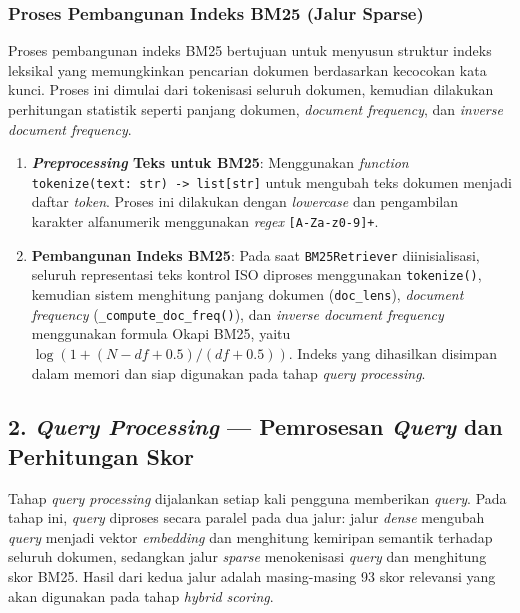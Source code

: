 \documentclass[12pt,a4paper]{article}
\begin{document}
\subsubsection*{Proses Pembangunan Indeks BM25 (Jalur Sparse)}

Proses pembangunan indeks BM25 bertujuan untuk menyusun struktur indeks leksikal yang memungkinkan pencarian dokumen berdasarkan kecocokan kata kunci. Proses ini dimulai dari tokenisasi seluruh dokumen, kemudian dilakukan perhitungan statistik seperti panjang dokumen, \textit{document frequency}, dan \textit{inverse document frequency}.

\begin{enumerate}[label=\alph*., leftmargin=1.1cm]
\item \textbf{\textit{Preprocessing} Teks untuk BM25}: Menggunakan \textit{function} \texttt{tokenize(text: str) -> list[str]} untuk mengubah teks dokumen menjadi daftar \textit{token}. Proses ini dilakukan dengan \textit{lowercase} dan pengambilan karakter alfanumerik menggunakan \textit{regex} \texttt{[A-Za-z0-9]+}.

\item \textbf{Pembangunan Indeks BM25}: Pada saat \texttt{BM25Retriever} diinisialisasi, seluruh representasi teks kontrol ISO diproses menggunakan \texttt{tokenize()}, kemudian sistem menghitung panjang dokumen (\texttt{doc\_lens}), \textit{document frequency} (\texttt{\_compute\_doc\_freq()}), dan \textit{inverse document frequency} menggunakan formula Okapi BM25, yaitu $\log(1 + (N - df + 0.5) / (df + 0.5))$. Indeks yang dihasilkan disimpan dalam memori dan siap digunakan pada tahap \textit{query processing}.
\end{enumerate}

\subsection*{2. \textit{Query Processing} --- Pemrosesan \textit{Query} dan Perhitungan Skor}

Tahap \textit{query processing} dijalankan setiap kali pengguna memberikan \textit{query}. Pada tahap ini, \textit{query} diproses secara paralel pada dua jalur: jalur \textit{dense} mengubah \textit{query} menjadi vektor \textit{embedding} dan menghitung kemiripan semantik terhadap seluruh dokumen, sedangkan jalur \textit{sparse} menokenisasi \textit{query} dan menghitung skor BM25. Hasil dari kedua jalur adalah masing-masing 93 skor relevansi yang akan digunakan pada tahap \textit{hybrid scoring}.
\end{document}
